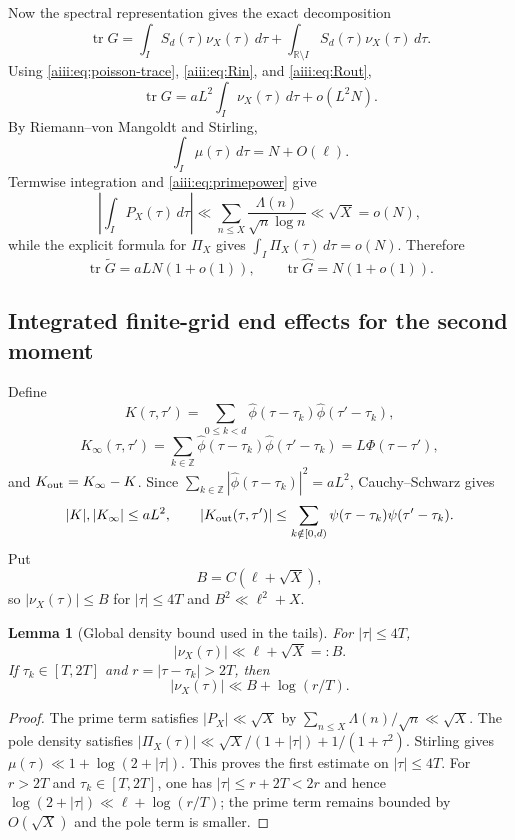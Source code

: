 \documentclass[11pt]{article}
\newtheorem{lemma}[theorem]{Lemma}
\DeclareMathOperator{\tr}{tr}
\begin{document}
Now the spectral representation gives the exact decomposition
\[
 \tr G
 =
 \int_I S_d(\tau)\nu_X(\tau)\,d\tau
 +
 \int_{\mathbb R\setminus I}S_d(\tau)\nu_X(\tau)\,d\tau.
\]
Using \eqref{aiii:eq:poisson-trace}, \eqref{aiii:eq:Rin}, and
\eqref{aiii:eq:Rout},
\begin{equation}\label{aiii:eq:trace-reduction}
 \tr G
 =
 aL^2\int_I\nu_X(\tau)\,d\tau+o(L^2N).
\end{equation}
By Riemann--von Mangoldt and Stirling,
\[
 \int_I\mu(\tau)\,d\tau=N+O(\ell).
\]
Termwise integration and \eqref{aiii:eq:primepower} give
\[
 \left|\int_I P_X(\tau)\,d\tau\right|
 \ll\sum_{n\le X}\frac{\Lambda(n)}{\sqrt n\log n}
 \ll\sqrt X=o(N),
\]
while the explicit formula for $\Pi_X$ gives
$\int_I\Pi_X(\tau)\,d\tau=o(N)$.  Therefore
\begin{equation}\label{aiii:eq:first}
 \tr\widetilde G=aLN(1+o(1)),
 \qquad
 \boxed{\tr\widehat G=N(1+o(1)).}
\end{equation}

\subsection{Integrated finite-grid end effects for the second moment}

Define
\[
 K(\tau,\tau')=
 \sum_{0\le k<d}\widehat\phi(\tau-\tau_k)
 \widehat\phi(\tau'-\tau_k),
\]
\[
 K_\infty(\tau,\tau')=
 \sum_{k\in\mathbb Z}\widehat\phi(\tau-\tau_k)
 \widehat\phi(\tau'-\tau_k)=L\Phi(\tau-\tau'),
\]
and $K_{\rm out}=K_\infty-K$.  Since
$\sum_{k\in\mathbb Z}|\widehat\phi(\tau-\tau_k)|^2=aL^2$,
Cauchy--Schwarz gives
\begin{equation}\label{aiii:eq:Kbound}
 |K|,|K_\infty|\le aL^2,
 \qquad
 |K_{\rm out}(\tau,\tau')|
 \le\sum_{k\notin[0,d)}\psi(\tau-\tau_k)\psi(\tau'-\tau_k).
\end{equation}
Put
\[
 B=C(\ell+\sqrt X),
\]
so $|\nu_X(\tau)|\le B$ for $|\tau|\le4T$ and
$B^2\ll \ell^2+X$.

\begin{lemma}[Global density bound used in the tails]\label{aiii:lem:nuglobal}
For $|\tau|\le4T$,
\[
 |\nu_X(\tau)|\ll \ell+\sqrt X=:B.
\]
If $\tau_k\in[T,2T]$ and $r=|\tau-\tau_k|>2T$, then
\[
 |\nu_X(\tau)|\ll B+\log(r/T).
\]
\end{lemma}

\begin{proof}
The prime term satisfies $|P_X|\ll\sqrt X$ by
$\sum_{n\le X}\Lambda(n)/\sqrt n\ll\sqrt X$.
The pole density satisfies
$|\Pi_X(\tau)|\ll \sqrt X/(1+|\tau|)+1/(1+\tau^2)$.
Stirling gives $\mu(\tau)\ll1+\log(2+|\tau|)$.
This proves the first estimate on $|\tau|\le4T$.
For $r>2T$ and $\tau_k\in[T,2T]$, one has
$|\tau|\le r+2T<2r$ and hence
$\log(2+|\tau|)\ll\ell+\log(r/T)$; the prime term remains bounded by
$O(\sqrt X)$ and the pole term is smaller.
\end{proof}
\end{document}

